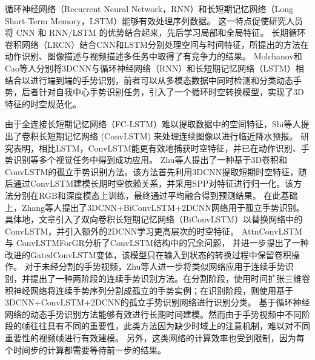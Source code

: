循环神经网络（Recurrent Neural Network，RNN）\cite{jozefowicz2015empirical}和长短期记忆网络（Long Short-Term Memory，LSTM）\cite{yue2015beyond}能够有效处理序列数据。
这一特点促使研究人员将 CNN 和 RNN/LSTM 的优势结合起来，先后学习局部和全局特征。
长期循环卷积网络（LRCN）\cite{donahue2015lrcn}结合CNN和LSTM分别处理空间与时间特征，所提出的方法在动作识别、图像描述与视频描述多任务中取得了有竞争力的结果。
Molchanov\cite{molchanov2016online}和Cao\cite{cao2017egocentric}等人分别将3DCNN与循环神经网络（RNN）和长短期记忆网络（LSTM）相结合以进行端到端的手势识别，前者可以从多模态数据中同时检测和分类动态手势，后者针对自我中心手势识别任务，引入了一个循环时空转换模型，实现了3D特征的时空规范化。

由于全连接长短期记忆网络（FC-LSTM）难以提取数据中的空间特征，Shi等人\cite{shi2015convlstm}提出了卷积长短期记忆网络 (ConvLSTM) 来处理连续图像以进行临近降水预报。
研究表明，相比LSTM，ConvLSTM能更有效地捕获时空特征，并已在动作识别、手势识别等多个视觉任务中得到成功应用。
Zhu等人\cite{zhu2017multimodal}提出了一种基于3D卷积和ConvLSTM的孤立手势识别方法。该方法首先利用3DCNN提取短期时空特征，随后通过ConvLSTM建模长期时空依赖关系，并采用SPP\cite{he2015spatial}对特征进行归一化。该方法分别在RGB和深度模态上训练，最终通过平均融合得到预测结果。
在此基础上，Zhang等人\cite{zhang2017learning}提出了3DCNN+BiConvLSTM+2DCNN网络用于孤立手势识别。具体地，文章引入了双向卷积长短期记忆网络（BiConvLSTM）以替换网络中的ConvLSTM，并引入额外的2DCNN学习更高层次的时空特征。
AttnConvLSTM\cite{zhang2018attention}与
ConvLSTMForGR\cite{zhu2019redundancy}分析了ConvLSTM结构中的冗余问题，
并进一步提出了一种改进的GatedConvLSTM变体，该模型只在输入到状态的转换过程中保留卷积操作。
对于未经分割的手势视频，Zhu等人\cite{zhu2018continuous}进一步将类似网络应用于连续手势识别，并提出了一种两阶段的连续手势识别方法。在分割阶段，使用时间扩张三维卷积神经网络将连续手势序列分割成孤立的手势实例；在识别阶段，则使用基于3DCNN+ConvLSTM+2DCNN的孤立手势识别网络进行识别分类。
基于循环神经网络的动态手势识别方法能够有效进行长期时间建模。然而由于手势视频中不同阶段的帧往往具有不同的重要性\cite{lin2018large}，此类方法因为缺少时域上的注意机制，难以对不同重要性的视频帧进行有效建模。
另外，这类网络的计算效率也受到限制，因为每个时间步的计算都需要等待前一步的结果。

